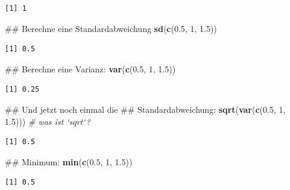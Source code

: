 \documentclass[12pt,]{tufte-book}
\newenvironment{Shaded}{\begin{snugshade}}{\end{snugshade}}
\newcommand{\KeywordTok}[1]{\textcolor[rgb]{0.13,0.29,0.53}{\textbf{#1}}}
\newcommand{\DecValTok}[1]{\textcolor[rgb]{0.00,0.00,0.81}{#1}}
\newcommand{\FloatTok}[1]{\textcolor[rgb]{0.00,0.00,0.81}{#1}}
\newcommand{\CommentTok}[1]{\textcolor[rgb]{0.56,0.35,0.01}{\textit{#1}}}
\newcommand{\NormalTok}[1]{#1}
\theoremstyle{definition}
\theoremstyle{definition}
\theoremstyle{definition}
\theoremstyle{remark}
\begin{document}
\begin{verbatim}
[1] 1
\end{verbatim}

\begin{Shaded}
\begin{Highlighting}[]
\NormalTok{## Berechne eine Standardabweichung}
\KeywordTok{sd}\NormalTok{(}\KeywordTok{c}\NormalTok{(}\FloatTok{0.5}\NormalTok{, }\DecValTok{1}\NormalTok{, }\FloatTok{1.5}\NormalTok{))}
\end{Highlighting}
\end{Shaded}

\begin{verbatim}
[1] 0.5
\end{verbatim}

\begin{Shaded}
\begin{Highlighting}[]
\NormalTok{## Berechne eine Varianz:}
\KeywordTok{var}\NormalTok{(}\KeywordTok{c}\NormalTok{(}\FloatTok{0.5}\NormalTok{, }\DecValTok{1}\NormalTok{, }\FloatTok{1.5}\NormalTok{))}
\end{Highlighting}
\end{Shaded}

\begin{verbatim}
[1] 0.25
\end{verbatim}

\begin{Shaded}
\begin{Highlighting}[]
\NormalTok{## Und jetzt noch einmal die}
\NormalTok{## Standardabweichung:}
\KeywordTok{sqrt}\NormalTok{(}\KeywordTok{var}\NormalTok{(}\KeywordTok{c}\NormalTok{(}\FloatTok{0.5}\NormalTok{, }\DecValTok{1}\NormalTok{, }\FloatTok{1.5}\NormalTok{)))  }\CommentTok{# was ist `sqrt`?}
\end{Highlighting}
\end{Shaded}

\begin{verbatim}
[1] 0.5
\end{verbatim}

\begin{Shaded}
\begin{Highlighting}[]
\NormalTok{## Minimum:}
\KeywordTok{min}\NormalTok{(}\KeywordTok{c}\NormalTok{(}\FloatTok{0.5}\NormalTok{, }\DecValTok{1}\NormalTok{, }\FloatTok{1.5}\NormalTok{))}
\end{Highlighting}
\end{Shaded}

\begin{verbatim}
[1] 0.5
\end{verbatim}
\end{document}
